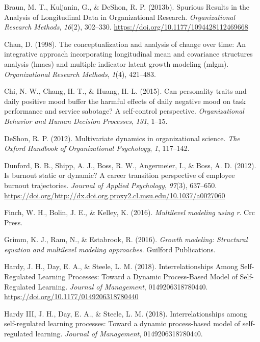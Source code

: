 \documentclass[english,,man]{apa6}
\begin{document}
\leavevmode\hypertarget{ref-braun_spurious_2013}{}%
Braun, M. T., Kuljanin, G., \& DeShon, R. P. (2013b). Spurious Results in the Analysis of Longitudinal Data in Organizational Research. \emph{Organizational Research Methods}, \emph{16}(2), 302--330. \url{https://doi.org/10.1177/1094428112469668}

\leavevmode\hypertarget{ref-chan1998conceptualization}{}%
Chan, D. (1998). The conceptualization and analysis of change over time: An integrative approach incorporating longitudinal mean and covariance structures analysis (lmacs) and multiple indicator latent growth modeling (mlgm). \emph{Organizational Research Methods}, \emph{1}(4), 421--483.

\leavevmode\hypertarget{ref-chi_can_2015}{}%
Chi, N.-W., Chang, H.-T., \& Huang, H.-L. (2015). Can personality traits and daily positive mood buffer the harmful effects of daily negative mood on task performance and service sabotage? A self-control perspective. \emph{Organizational Behavior and Human Decision Processes}, \emph{131}, 1--15.

\leavevmode\hypertarget{ref-deshon_multivariate_2012}{}%
DeShon, R. P. (2012). Multivariate dynamics in organizational science. \emph{The Oxford Handbook of Organizational Psychology}, \emph{1}, 117--142.

\leavevmode\hypertarget{ref-dunford_is_2012}{}%
Dunford, B. B., Shipp, A. J., Boss, R. W., Angermeier, I., \& Boss, A. D. (2012). Is burnout static or dynamic? A career transition perspective of employee burnout trajectories. \emph{Journal of Applied Psychology}, \emph{97}(3), 637--650. \url{https://doi.org/http://dx.doi.org.proxy2.cl.msu.edu/10.1037/a0027060}

\leavevmode\hypertarget{ref-finch2016multilevel}{}%
Finch, W. H., Bolin, J. E., \& Kelley, K. (2016). \emph{Multilevel modeling using r}. Crc Press.

\leavevmode\hypertarget{ref-grimm_growth_2016}{}%
Grimm, K. J., Ram, N., \& Estabrook, R. (2016). \emph{Growth modeling: Structural equation and multilevel modeling approaches}. Guilford Publications.

\leavevmode\hypertarget{ref-hardy_interrelationships_2018}{}%
Hardy, J. H., Day, E. A., \& Steele, L. M. (2018). Interrelationships Among Self-Regulated Learning Processes: Toward a Dynamic Process-Based Model of Self-Regulated Learning. \emph{Journal of Management}, 0149206318780440. \url{https://doi.org/10.1177/0149206318780440}

\leavevmode\hypertarget{ref-hardy2018}{}%
Hardy III, J. H., Day, E. A., \& Steele, L. M. (2018). Interrelationships among self-regulated learning processes: Toward a dynamic process-based model of self-regulated learning. \emph{Journal of Management}, 0149206318780440.
\end{document}
